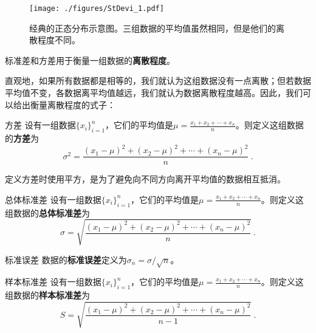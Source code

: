 


\begin{figure}[ht]
\centering
\texttt{[image: ./figures/StDevi\_1.pdf]}
\caption{经典的正态分布示意图。三组数据的平均值虽然相同，但是他们的离散程度不同。} \label{StDevi_fig1}
\end{figure}

标准差和方差用于衡量一组数据的\textbf{离散程度}。

直观地，如果所有数据都是相等的，我们就认为这组数据没有一点离散；但若数据平均值不变，各数据离平均值越远，我们就认为数据离散程度越高。因此，我们可以给出衡量离散程度的式子：

\begin{definition}{方差}\label{StDevi_def1}
设有一组数据$\{x_i\}_{i=1}^n$，它们的平均值是$\mu=\frac{x_1+x_2+\cdots+x_n}{n}$。则定义这组数据的\textbf{方差}为
\begin{equation}\label{StDevi_eq1}
\sigma^2 = \frac{(x_1-\mu)^2+(x_2-\mu)^2+\cdots+(x_n-\mu)^2}{n}~.
\end{equation}
\end{definition}

定义方差时使用平方，是为了避免向不同方向离开平均值的数据相互抵消。

\begin{definition}{总体标准差}
设有一组数据$\{x_i\}_{i=1}^n$，它们的平均值是$\mu=\frac{x_1+x_2+\cdots+x_n}{n}$。则定义这组数据的\textbf{总体标准差}为
\begin{equation}
\sigma = \sqrt{\frac{(x_1-\mu)^2+(x_2-\mu)^2+\cdots+(x_n-\mu)^2}{n}}~.
\end{equation}
\end{definition}

\begin{definition}{标准误差}
数据的\textbf{标准误差}定义为$\sigma_n=\sigma/\sqrt{n}$。
\end{definition}





\begin{definition}{样本标准差}
设有一组数据$\{x_i\}_{i=1}^n$，它们的平均值是$\mu=\frac{x_1+x_2+\cdots+x_n}{n}$。则定义这组数据的\textbf{样本标准差}为
\begin{equation}
S = \sqrt{\frac{(x_1-\mu)^2+(x_2-\mu)^2+\cdots+(x_n-\mu)^2}{n-1}}~.
\end{equation}
\end{definition}


